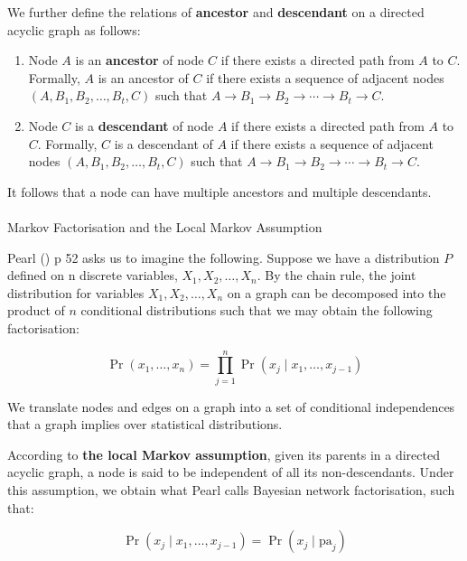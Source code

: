\documentclass[
  single column]{article}
\makeatletter
\let\oldparagraph\paragraph
\renewcommand{\paragraph}{
    \@ifstar
      \xxxParagraphStar
      \xxxParagraphNoStar
  }
\newcommand{\xxxParagraphStar}[1]{\oldparagraph*{#1}\mbox{}}
\newcommand{\xxxParagraphNoStar}[1]{\oldparagraph{#1}\mbox{}}
\providecommand{\tightlist}{%
  \setlength{\itemsep}{0pt}\setlength{\parskip}{0pt}}\usepackage{longtable,booktabs,array}
\makeatother
\begin{document}
We further define the relations of \textbf{ancestor} and
\textbf{descendant} on a directed acyclic graph as follows:

\begin{enumerate}
\def\labelenumi{\arabic{enumi}.}
\tightlist
\item
  Node \(A\) is an \textbf{ancestor} of node \(C\) if there exists a
  directed path from \(A\) to \(C\). Formally, \(A\) is an ancestor of
  \(C\) if there exists a sequence of adjacent nodes
  \((A, B_1, B_2, \ldots, B_t, C)\) such that
  \(A \rightarrow B_1 \rightarrow B_2 \rightarrow \cdots \rightarrow B_t \rightarrow C\).
\item
  Node \(C\) is a \textbf{descendant} of node \(A\) if there exists a
  directed path from \(A\) to \(C\). Formally, \(C\) is a descendant of
  \(A\) if there exists a sequence of adjacent nodes
  \((A, B_1, B_2, \ldots, B_t, C)\) such that
  \(A \rightarrow B_1 \rightarrow B_2 \rightarrow \cdots \rightarrow B_t \rightarrow C\).
\end{enumerate}

It follows that a node can have multiple ancestors and multiple
descendants.

\paragraph{Markov Factorisation and the Local Markov
Assumption}\label{markov-factorisation-and-the-local-markov-assumption}

Pearl () p 52 asks us to imagine the
following. Suppose we have a distribution \(P\) defined on n discrete
variables, \(X_1, X_2, \dots, X_n\). By the chain rule, the joint
distribution for variables \(X_1, X_2, \dots, X_n\) on a graph can be
decomposed into the product of \(n\) conditional distributions such that
we may obtain the following factorisation:

\[
\Pr(x_1, \dots, x_n) = \prod_{j=1}^n \Pr(x_j \mid x_1, \dots, x_{j-1})
\]

We translate nodes and edges on a graph into a set of conditional
independences that a graph implies over statistical distributions.

According to \textbf{the local Markov assumption}, given its parents in
a directed acyclic graph, a node is said to be independent of all its
non-descendants. Under this assumption, we obtain what Pearl calls
Bayesian network factorisation, such that:

\[
\Pr(x_j \mid x_1, \dots, x_{j-1}) = \Pr(x_j \mid \text{pa}_j)
\]
\end{document}
